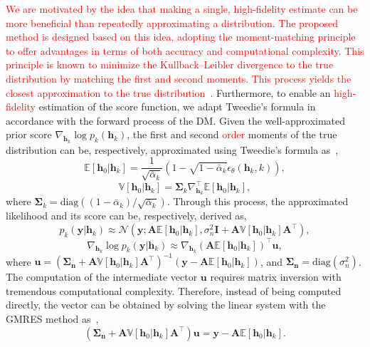 \documentclass[lettersize,journal]{IEEEtran}
\newcommand{\tred}{\textcolor{red}}
\begin{document}
\tred{We are motivated by the idea that making a single, high-fidelity estimate can be more beneficial than repeatedly approximating a distribution. The proposed method is designed based on this idea, adopting the moment-matching principle to offer advantages in terms of both accuracy and computational complexity. This principle is known to minimize the Kullback–Leibler divergence to the true distribution by matching the first and second moments. This process yields the closest approximation to the true distribution~\cite{bishopPatternRecognitionMachine2006}.} Furthermore, to enable an \tred{high-fidelity} estimation of the score function, we adapt Tweedie’s formula in accordance with the forward process of the DM.
Given the well-approximated prior score $\nabla_{\mathbf{h}_{k}}\log p_{k}(\mathbf{h}_{k})$, the first and second \tred{order} moments of the true distribution can be, respectively, approximated using Tweedie's formula as~\cite{efronTweediesFormulaSelection2011},
\begin{equation}
\label{eq:first_moment}
\mathbb{E}[\mathbf{h}_{0}|\mathbf{h}_{k}] = \frac{1}{\sqrt{ \bar{\alpha}_{k} }}(1-\sqrt{ 1-\bar{\alpha}_{k} }\epsilon_{\theta}(\mathbf{h}_{k},k)),
\end{equation}
\begin{equation}
\label{eq:second_moment}
\mathbb{V}[\mathbf{h}_{0}|\mathbf{h}_{k}] = \boldsymbol{\Sigma}_{k}\nabla_{\mathbf{h}_{k}}^{\top}\mathbb{E}[\mathbf{h}_{0}|\mathbf{h}_{k}],
\end{equation}
where $\boldsymbol{\Sigma}_{k} = \text{diag}((1-\bar{\alpha}_{k}) / \sqrt{ \bar{\alpha}_{k} })$. Through this process, the approximated likelihood and its score can be, respectively, derived as,
\begin{equation}
\label{eq:likelihood_approx}
p_{k}(\mathbf{y}|\mathbf{h}_{k}) \approx \mathcal{N}(\mathbf{y}; \mathbf{A}\mathbb{E}[\mathbf{h}_{0}|\mathbf{h}_{k}], \sigma_{n}^{2}\mathbf{I}+\mathbf{A}\mathbb{V}[\mathbf{h}_{0}|\mathbf{h}_{k}]\mathbf{A}^{\top}),
\end{equation}
\begin{equation}
\label{eq:likelihood_score_approx}
\nabla_{\mathbf{h}_{k}}\log p_{k}(\mathbf{y}|\mathbf{h}_{k}) \approx \nabla_{\mathbf{h}_{k}} (\mathbf{A}\mathbb{E}[\mathbf{h}_{0}|\mathbf{h}_{k}])^{\top}\mathbf{u},
\end{equation}
where $\mathbf{u} = (\boldsymbol{\Sigma}_{\mathbf{n}}+\mathbf{A}\mathbb{V}[\mathbf{h}_{0}|\mathbf{h}_{k}]\mathbf{A}^{\top})^{-1}(\mathbf{y}- \mathbf{A}\mathbb{E}[\mathbf{h}_{0}|\mathbf{h}_{k}])$, and $\boldsymbol{\Sigma}_{\mathbf{n}} = \text{diag}(\sigma_{n}^{2})$. The computation of the intermediate vector $\mathbf{u}$ requires matrix inversion with tremendous computational complexity. Therefore, instead of being computed directly, the vector can be obtained by solving the linear system with the GMRES method as~\cite{saadGMRESGeneralizedMinimal1986},
\begin{equation}
\label{eq:linear_system}
(\boldsymbol{\Sigma}_{\mathbf{n}}+\mathbf{A}\mathbb{V}[\mathbf{h}_{0}|\mathbf{h}_{k}]\mathbf{A}^{\top})\mathbf{u} = \mathbf{y}- \mathbf{A}\mathbb{E}[\mathbf{h}_{0}|\mathbf{h}_{k}].
\end{equation}
\end{document}
